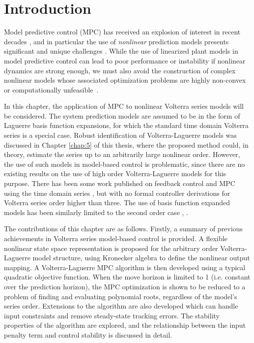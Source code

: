 \section{Introduction}

Model predictive control (MPC) has received an explosion of interest in recent decades \cite{Mayne2014}, and in particular the use of \emph{nonlinear} prediction models presents significant and unique challenges \cite{Grune2011}. While the use of linearized plant models in model predictive control can lead to poor performance or instability if nonlinear dynamics are strong enough, we must also avoid the construction of complex nonlinear models whose associated optimization problems are highly non-convex or computationally unfeasible~\cite{Mayne1996}.

In this chapter, the application of MPC to nonlinear Volterra series models will be considered. The system prediction models are assumed to be in the form of Laguerre basis function expansions, for which the standard time domain Volterra series is a special case. Robust identification of Volterra-Laguerre models was discussed in Chapter \ref{chap:5} of this thesis, where the proposed method could, in theory, estimate the series up to an arbitrarily large nonlinear order. However, the use of such models in model-based control is problematic, since there are no existing results on the use of high order Volterra-Laguerre models for this purpose. There has been some work published on feedback control and MPC using the time domain series \cite{Doyle2002}, but with no formal controller derivations for Volterra series order higher than three. The use of basis function expanded models has been similarly limited to the second order case \cite{Parker1998}, \cite{Parker2002}.  

The contributions of this chapter are as follows. Firstly, a summary of previous achievements in Volterra series model-based control is provided. A flexible nonlinear state space representation is proposed for the arbitrary order Volterra-Laguerre model structure, using Kronecker algebra to define the nonlinear output mapping. A Volterra-Laguerre MPC algorithm is then developed using a typical quadratic objective function. When the move horizon is limited to 1 (i.e. constant over the prediction horizon), the MPC optimization is shown to be reduced to a problem of finding and evaluating polynomial roots, regardless of the model's series order. Extensions to the algorithm are also developed which can handle input constraints and remove steady-state tracking errors. The stability properties of the algorithm are explored, and the relationship between the input penalty term and control stability is discussed in detail.


